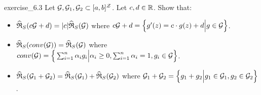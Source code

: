\begin{exercise}{}{exercise_6.3}
    Let $\G, \G_1, \G_2 \subset [a,b]^{\mathcal{Z}}$. Let $c, d \in \R$. Show that:
    \begin{itemize}
        \item $\ERC_S(c\G + d) = |c|\ERC_S(\G)$ where $c\G+d=\bigCurl{g'(z) = c\cdot g(z) + d \Big| g\in\G}$.
        \item $\ERC_S(conv(\G))=\ERC_S(\G)$ where $conv(\G)=\bigCurl{\sum_{i=1}^n \alpha_ig_i\Big|\alpha_i\ge0, \sum_{i=1}^n\alpha_i=1, g_i\in\G}$.
        \item $\ERC_S(\G_1 + \G_2)=\ERC_S(\G_1) + \ERC_S(\G_2)$ where $\G_1 + \G_2 = \bigCurl{g_1 + g_2 \Big| g_1\in\G_1, g_2\in\G_2}$.
    \end{itemize}
\end{exercise}

\begin{solution*}
    
\end{solution*}

